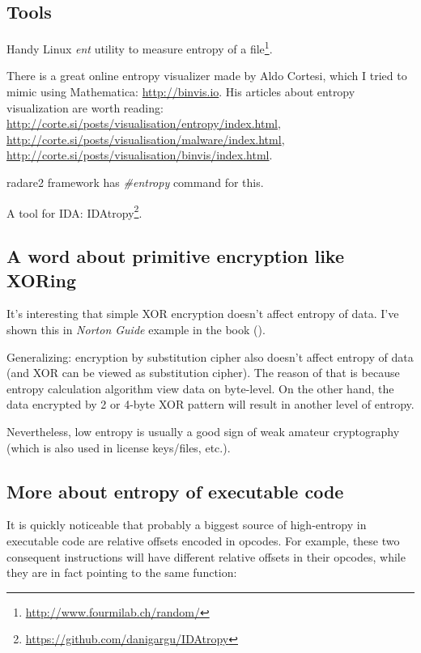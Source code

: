\subsection{Tools}

Handy Linux \emph{ent} utility to measure entropy of a file\footnote{\url{http://www.fourmilab.ch/random/}}.

There is a great online entropy visualizer made by Aldo Cortesi, 
which I tried to mimic using Mathematica: \url{http://binvis.io}.
His articles about entropy visualization are worth reading:
\url{http://corte.si/posts/visualisation/entropy/index.html},
\url{http://corte.si/posts/visualisation/malware/index.html},
\url{http://corte.si/posts/visualisation/binvis/index.html}.

radare2 framework has \emph{\#entropy} command for this.

A tool for IDA: IDAtropy\footnote{\url{https://github.com/danigargu/IDAtropy}}.

\subsection{A word about primitive encryption like XORing}

It's interesting that simple XOR encryption doesn't affect entropy of data.
I've shown this in \emph{Norton Guide} example in the book ().

Generalizing: encryption by substitution cipher also doesn't affect entropy of data
(and XOR can be viewed as substitution cipher).
The reason of that is because entropy calculation algorithm view data on byte-level.
On the other hand, the data encrypted by 2 or 4-byte XOR pattern will result in another level of entropy.

Nevertheless, low entropy is usually a good sign of weak amateur cryptography
(which is also used in license keys/files, etc.).

\subsection{More about entropy of executable code}

It is quickly noticeable that probably a biggest source of high-entropy in executable code
are relative offsets encoded in opcodes.
For example, these two consequent instructions will have different relative offsets in their opcodes, 
while they are in fact pointing to the same function:


